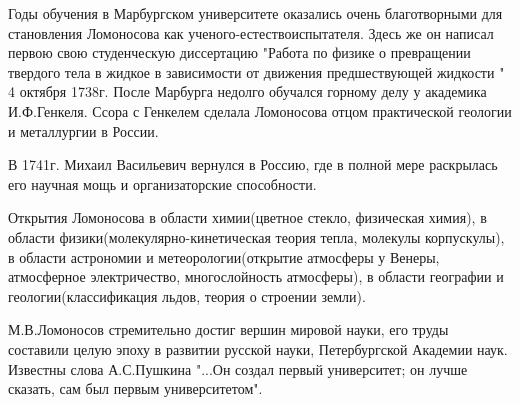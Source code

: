 	Годы обучения в Марбургском университете оказались очень благотворными для становления Ломоносова как ученого-естествоиспытателя. Здесь же он написал первою свою студенческую диссертацию "Работа по физике о превращении твердого тела в жидкое в зависимости от движения предшествующей жидкости " 4 октября 1738г. После Марбурга недолго обучался горному делу у академика И.Ф.Генкеля. Ссора с Генкелем сделала Ломоносова отцом практической геологии и металлургии в России.

	В 1741г. Михаил Васильевич вернулся в Россию, где в полной мере раскрылась его научная мощь и организаторские способности.

	Открытия Ломоносова в области химии(цветное стекло, физическая химия), в области физики(молекулярно-кинетическая теория тепла, молекулы корпускулы), в области астрономии и метеорологии(открытие атмосферы у Венеры, атмосферное электричество, многослойность атмосферы), в области географии и геологии(классификация льдов, теория о строении земли).

	М.В.Ломоносов стремительно достиг вершин мировой науки, его труды составили целую эпоху в развитии русской науки, Петербургской Академии наук. Известны слова А.С.Пушкина "...Он создал первый университет; он лучше сказать, сам был первым университетом".


